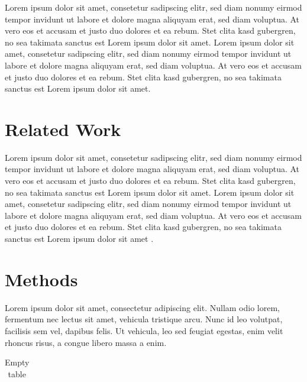 \documentclass[11pt,a4paper,twoside,openright]{report}
\begin{document}
Lorem ipsum dolor sit amet, consetetur sadipscing elitr, sed diam nonumy
eirmod tempor invidunt ut labore et dolore magna aliquyam erat, sed diam voluptua. At
vero eos et accusam et justo duo dolores et ea rebum. Stet clita kasd gubergren, no sea
takimata sanctus est Lorem ipsum dolor sit amet. Lorem ipsum dolor sit amet, consetetur
sadipscing elitr, sed diam nonumy eirmod tempor invidunt ut labore et dolore magna
aliquyam erat, sed diam voluptua. At vero eos et accusam et justo duo dolores et ea
rebum. Stet clita kasd gubergren, no sea takimata sanctus est Lorem ipsum dolor sit amet.

\chapter{Related Work}
\label{sec:related}

Lorem ipsum dolor sit amet, consetetur sadipscing elitr, sed diam nonumy
eirmod tempor invidunt ut labore et dolore magna aliquyam erat, sed diam voluptua. At
vero eos et accusam et justo duo dolores et ea rebum. Stet clita kasd gubergren, no sea
takimata sanctus est Lorem ipsum dolor sit amet. Lorem ipsum dolor sit amet, consetetur
sadipscing elitr, sed diam nonumy eirmod tempor invidunt ut labore et dolore magna
aliquyam erat, sed diam voluptua. At vero eos et accusam et justo duo dolores et ea
rebum. Stet clita kasd gubergren, no sea takimata sanctus est Lorem ipsum dolor sit amet \cite{Kamal:2007:PCT:1321261.1321264, Vitanen:2012, Olsen:2004, Musgrave:1989:SRE:74333.74337, mei:inria-00402079, Fournier:1982:CRS:358523.358553, Krten:1994, Shimrat:1962:APP:368637.368653, Woo:1999:OPG:554539}.

\chapter{Methods}
\label{sec:methods}

Lorem ipsum dolor sit amet, consectetur adipiscing elit. Nullam odio lorem, fermentum nec lectus sit amet, vehicula tristique arcu. Nunc id leo volutpat, facilisis sem vel, dapibus felis. Ut vehicula, leo sed feugiat egestas, enim velit rhoncus risus, a congue libero massa a enim.

\begin{table}
\caption{Empty table}
\begin{tabular}{|ccc|}

\end{tabular}
\end{table}
\end{document}
